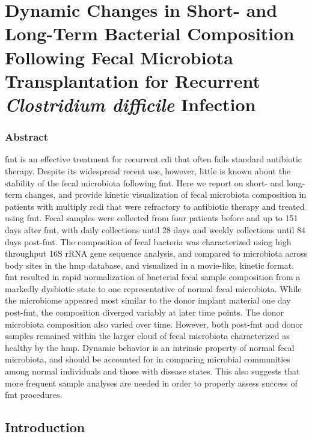 \glsresetall

\section{Dynamic Changes in Short- and Long-Term Bacterial Composition Following Fecal Microbiota Transplantation for Recurrent \textit{Clostridium difficile} Infection}

\subsubsection{Abstract}

\Gls{fmt} is an effective treatment for recurrent \gls{cdi} that often fails standard antibiotic therapy. Despite its widespread recent use, however, little is known about the stability of the fecal microbiota following \gls{fmt}. Here we report on short- and long-term changes, and provide kinetic visualization of fecal microbiota composition in patients with multiply \gls{rcdi} that were refractory to antibiotic therapy and treated using \gls{fmt}. Fecal samples were collected from four patients before and up to 151 days after \gls{fmt}, with daily collections until 28 days and weekly collections until 84 days post-\gls{fmt}. The composition of fecal bacteria was characterized using high throughput 16S rRNA gene sequence analysis, and compared to microbiota across body sites in the \gls{hmp} database, and visualized in a movie-like, kinetic format. \gls{fmt} resulted in rapid normalization of bacterial fecal sample composition from a markedly dysbiotic state to one representative of normal fecal microbiota.  While the microbiome appeared most similar to the donor implant material one day post-\gls{fmt}, the composition diverged variably at later time points. The donor microbiota composition also varied over time. However, both post-\gls{fmt} and donor samples remained within the larger cloud of fecal microbiota characterized as healthy by the \gls{hmp}. Dynamic behavior is an intrinsic property of normal fecal microbiota, and should be accounted for in comparing microbial communities among normal individuals and those with disease states.  This also suggests that more frequent sample analyses are needed in order to properly assess success of \gls{fmt} procedures.

\subsection{Introduction}

